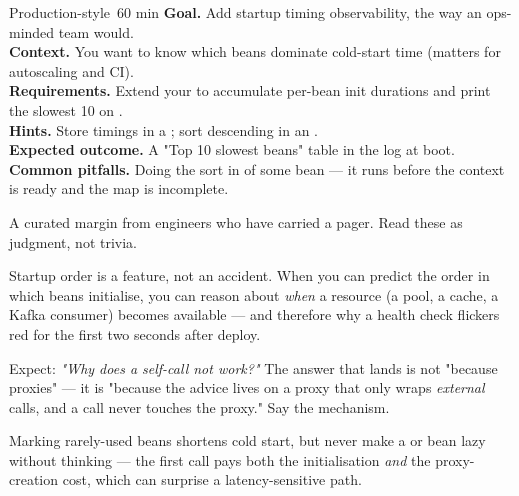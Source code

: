 \begin{minilab}{Production-style}{~60 min}
\textbf{Goal.} Add startup timing observability, the way an ops-minded team would.\\
\textbf{Context.} You want to know which beans dominate cold-start time (matters for autoscaling and CI).\\
\textbf{Requirements.} Extend your  to accumulate per-bean init durations and print the slowest 10 on .\\
\textbf{Hints.} Store timings in a ; sort descending in an .\\
\textbf{Expected outcome.} A "Top 10 slowest beans" table in the log at boot.\\
\textbf{Common pitfalls.} Doing the sort in  of some bean — it runs before the context is ready and the map is incomplete.
\end{minilab}


A curated margin from engineers who have carried a pager. Read these as judgment, not trivia.

\begin{seniornote}
Startup order is a feature, not an accident. When you can predict the order in which beans initialise, you can reason about \emph{when} a resource (a pool, a cache, a Kafka consumer) becomes available — and therefore why a health check flickers red for the first two seconds after deploy.
\end{seniornote}

\begin{interview}
Expect: \emph{"Why does a  self-call not work?"} The answer that lands is not "because proxies" — it is "because the advice lives on a proxy that only wraps \emph{external} calls, and a  call never touches the proxy." Say the mechanism.
\end{interview}

\begin{perfnote}
Marking rarely-used beans  shortens cold start, but never make a  or  bean lazy without thinking — the first call pays both the initialisation \emph{and} the proxy-creation cost, which can surprise a latency-sensitive path.
\end{perfnote}

